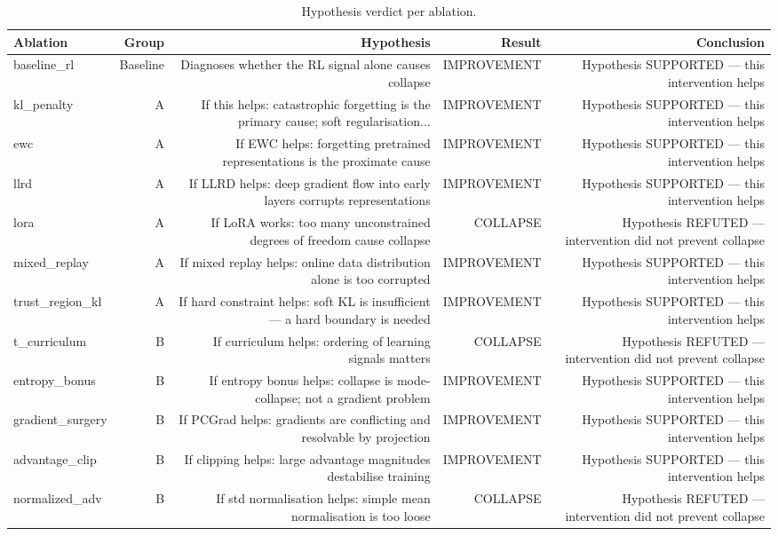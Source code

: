 \begin{table}[htbp]
\centering
\caption{Hypothesis verdict per ablation.}
\label{tab:hypothesis}
\begin{tabular}{lrrrr}
\toprule
\textbf{Ablation} & \textbf{Group} & \textbf{Hypothesis} & \textbf{Result} & \textbf{Conclusion} \\
\midrule
baseline_rl & Baseline & Diagnoses whether the RL signal alone causes collapse & IMPROVEMENT & Hypothesis SUPPORTED — this intervention helps \\
kl_penalty & A & If this helps: catastrophic forgetting is the primary cause; soft regularisation... & IMPROVEMENT & Hypothesis SUPPORTED — this intervention helps \\
ewc & A & If EWC helps: forgetting pretrained representations is the proximate cause & IMPROVEMENT & Hypothesis SUPPORTED — this intervention helps \\
llrd & A & If LLRD helps: deep gradient flow into early layers corrupts representations & IMPROVEMENT & Hypothesis SUPPORTED — this intervention helps \\
lora & A & If LoRA works: too many unconstrained degrees of freedom cause collapse & COLLAPSE & Hypothesis REFUTED — intervention did not prevent collapse \\
mixed_replay & A & If mixed replay helps: online data distribution alone is too corrupted & IMPROVEMENT & Hypothesis SUPPORTED — this intervention helps \\
trust_region_kl & A & If hard constraint helps: soft KL is insufficient — a hard boundary is needed & IMPROVEMENT & Hypothesis SUPPORTED — this intervention helps \\
t_curriculum & B & If curriculum helps: ordering of learning signals matters & COLLAPSE & Hypothesis REFUTED — intervention did not prevent collapse \\
entropy_bonus & B & If entropy bonus helps: collapse is mode-collapse; not a gradient problem & IMPROVEMENT & Hypothesis SUPPORTED — this intervention helps \\
gradient_surgery & B & If PCGrad helps: gradients are conflicting and resolvable by projection & IMPROVEMENT & Hypothesis SUPPORTED — this intervention helps \\
advantage_clip & B & If clipping helps: large advantage magnitudes destabilise training & IMPROVEMENT & Hypothesis SUPPORTED — this intervention helps \\
normalized_adv & B & If std normalisation helps: simple mean normalisation is too loose & COLLAPSE & Hypothesis REFUTED — intervention did not prevent collapse \\

\end{tabular}
\end{table}
